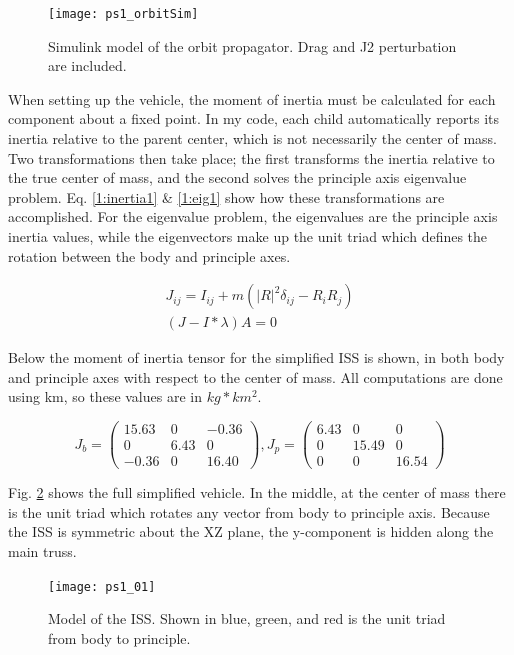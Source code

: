 \documentclass[12pt, letterpaper]{article}
\begin{document}
\begin{figure}[H]
	\centering
	\texttt{[image: ps1\_orbitSim]}
	\caption{Simulink model of the orbit propagator. Drag and J2 perturbation are included.}
	\label{1:orbit}
\end{figure}

When setting up the vehicle, the moment of inertia must be calculated for each component about a fixed point. In my code, each child automatically reports its inertia relative to the parent center, which is not necessarily the center of mass. Two transformations then take place; the first transforms the inertia relative to the true center of mass, and the second solves the principle axis eigenvalue problem. Eq. \ref{1:inertia1} \& \ref{1:eig1} show how these transformations are accomplished. For the eigenvalue problem, the eigenvalues are the principle axis inertia values, while the eigenvectors make up the unit triad which defines the rotation between the body and principle axes.

\begin{gather}
J_{ij} = I_{ij} + m(|R|^2\delta_{ij}-R_iR_j)
\label{1:inertia1} \\ 
(J-I*\lambda)A=0
\label{1:eig1}
\end{gather}

Below the moment of inertia tensor for the simplified ISS is shown, in both body and principle axes with respect to the center of mass. All computations are done using km, so these values are in $kg*km^2$.


\begin{equation}
J_b =\left(\begin{array}{ccc} 15.63 & 0 & -0.36\\ 0 & 6.43 & 0\\ -0.36 & 0 & 16.40 \end{array}\right), J_p =
\left(\begin{array}{ccc} 6.43 & 0 & 0\\ 0 & 15.49 & 0\\ 0 & 0 & 16.54 \end{array}\right)
\label{1:eqJ}
\end{equation}


Fig. \ref{1:iss} shows the full simplified vehicle. In the middle, at the center of mass there is the unit triad which rotates any vector from body to principle axis. Because the ISS is symmetric about the XZ plane, the y-component is hidden along the main truss. 

\begin{figure}[H]
	\centering
	\texttt{[image: ps1\_01]}
	\caption{Model of the ISS. Shown in blue, green, and red is the unit triad from body to principle.}
	\label{1:iss}
\end{figure}
\end{document}
